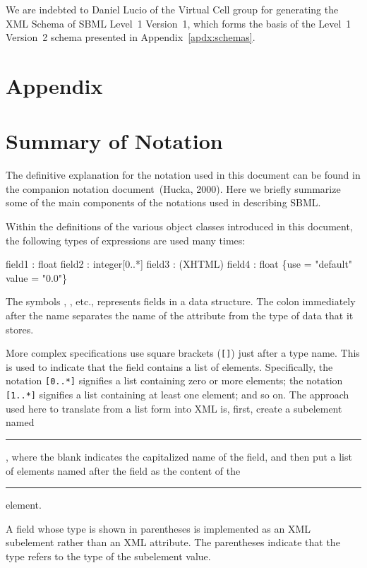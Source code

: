 \documentclass[10pt]{cekarticle}
\begin{document}
We are indebted to Daniel Lucio of the Virtual Cell group for generating
the XML Schema of SBML Level~1 Version~1, which forms the basis of the
Level~1 Version~2 schema presented in Appendix~\ref{apdx:schemas}.


\newpage
\section{Appendix}
\setcounter{secnumdepth}{2}
\appendix
\section{Summary of Notation}
\label{apdx:notation}

The definitive explanation for the notation used in this document can be
found in the companion notation document~(Hucka, 2000).  Here we briefly
summarize some of the main components of the notations used in describing
SBML.

Within the definitions of the various object classes introduced in this
document, the following types of expressions are used many times:

\begin{example}
  field1 : float
  field2 : integer[0..*]
  field3 : (XHTML)
  field4 : float \{use = "default" value = "0.0"\}
\end{example}

The symbols , , etc., represents fields in a
data structure.  The colon immediately after the name separates the name of
the attribute from the type of data that it stores.

More complex specifications use square brackets (\texttt{[]}) just after a
type name.  This is used to indicate that the field contains a list of
elements.  Specifically, the notation \texttt{[0..*]} signifies a list
containing zero or more elements; the notation \texttt{[1..*]} signifies a
list containing at least one element; and so on.  The approach used here to
translate from a list form into XML is, first, create a subelement named
\rule{0.5in}{0.5pt}, where the blank indicates the
capitalized name of the field, and then put a list of elements named after
the field as the content of the \rule{0.5in}{0.5pt}
element.

A field whose type is shown in parentheses is implemented as an XML
subelement rather than an XML attribute.  The parentheses indicate that the
type refers to the type of the subelement value.
\end{document}
